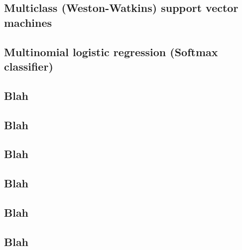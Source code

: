 \subsection{Multiclass (Weston-Watkins) support vector machines}
\subsection{Multinomial logistic regression (Softmax classifier)}
\subsection{Blah}
\subsection{Blah}
\subsection{Blah}
\subsection{Blah}
\subsection{Blah}
\subsection{Blah}